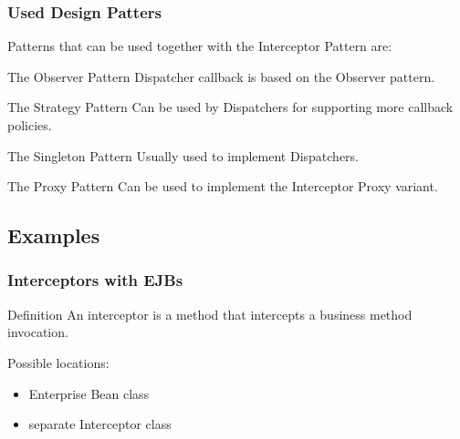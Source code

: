 \documentclass{beamer}
\begin{document}
\begin{frame}
  \frametitle{Used Design Patters}

  Patterns that can be used together with the Interceptor Pattern are:

  \begin{block}{The Observer Pattern}
  Dispatcher callback is based on the Observer pattern.
  \end{block}

  \begin{block}{The Strategy Pattern}
  Can be used by Dispatchers for supporting more callback policies.
  \end{block}

  \begin{block}{The Singleton Pattern}
  Usually used to implement Dispatchers.
  \end{block}

  \begin{block}{The Proxy Pattern}
  Can be used to implement the Interceptor Proxy variant.
  \end{block}

\end{frame}

\subsection{Examples}

\begin{frame}
  \frametitle{Interceptors with EJBs}

  \begin{block}{Definition}
  An \alert{interceptor} is a method that intercepts a business method invocation.
  \end{block}

  \pause

  Possible locations:
  \begin{itemize}
  \item Enterprise Bean class
  \item separate Interceptor class
  \end{itemize}

\end{frame}
\end{document}
